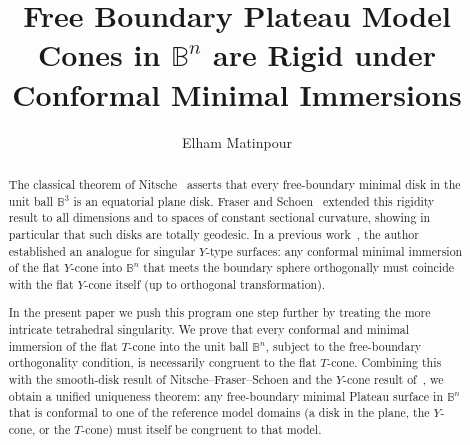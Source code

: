 \documentclass[11pt]{amsart}
\author{Elham Matinpour}
\title{Free Boundary Plateau Model Cones in $\mathbb{B}^n$ are Rigid under Conformal Minimal Immersions}
\numberwithin{equation}{section}
\theoremstyle{theorem}
\theoremstyle{definition}
\numberwithin{equation}{section}
\begin{document}
\maketitle

\begin{abstract}
The classical theorem of Nitsche~\cite{nitsche1985stationary} asserts that every free-boundary minimal disk in the unit ball \(\mathbb{B}^3\) is an equatorial plane disk. Fraser and Schoen~\cite{fraser2015uniqueness} extended this rigidity result to all dimensions and to spaces of constant sectional curvature, showing in particular that such disks are totally geodesic. In a previous work~\cite{matinpour2025cone}, the author established an analogue for singular \(Y\)-type surfaces: any conformal minimal immersion of the flat \(Y\)-cone into \(\mathbb{B}^n\) that meets the boundary sphere orthogonally must coincide with the flat \(Y\)-cone itself (up to orthogonal transformation).

In the present paper we push this program one step further by treating the more intricate tetrahedral singularity. We prove that every conformal and minimal immersion of the flat \(T\)-cone into the unit ball \(\mathbb{B}^n\), subject to the free-boundary orthogonality condition, is necessarily congruent to the flat \(T\)-cone. Combining this with the smooth-disk result of Nitsche--Fraser--Schoen and the \(Y\)-cone result of~\cite{matinpour2025cone}, we obtain a unified uniqueness theorem: any free-boundary minimal Plateau surface in \(\mathbb{B}^n\) that is conformal to one of the reference model domains (a disk in the plane, the \(Y\)-cone, or the \(T\)-cone) must itself be congruent to that model.
\end{abstract}
\end{document}
